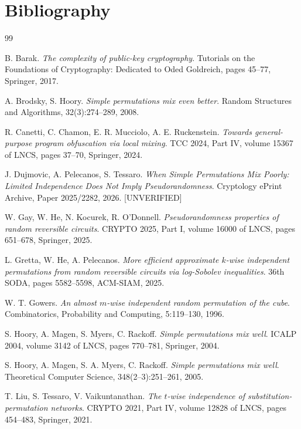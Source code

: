 \documentclass{aicr-conjecture}
\begin{document}
\section{Bibliography}

\begin{aicrbibliography}{99}

B. Barak.
\emph{The complexity of public-key cryptography}.
Tutorials on the Foundations of Cryptography: Dedicated to Oded
Goldreich, pages 45--77, Springer, 2017.

A. Brodsky, S. Hoory.
\emph{Simple permutations mix even better}.
Random Structures and Algorithms, 32(3):274--289, 2008.

R. Canetti, C. Chamon, E. R. Mucciolo, A. E. Ruckenstein.
\emph{Towards general-purpose program obfuscation via local mixing}.
TCC 2024, Part IV, volume 15367 of LNCS, pages 37--70, Springer, 2024.

J. Dujmovic, A. Pelecanos, S. Tessaro.
\emph{When Simple Permutations Mix Poorly: Limited Independence Does Not
Imply Pseudorandomness}.
Cryptology ePrint Archive, Paper 2025/2282, 2026. [UNVERIFIED]

W. Gay, W. He, N. Kocurek, R. O'Donnell.
\emph{Pseudorandomness properties of random reversible circuits}.
CRYPTO 2025, Part I, volume 16000 of LNCS, pages 651--678, Springer,
2025.

L. Gretta, W. He, A. Pelecanos.
\emph{More efficient approximate $k$-wise independent permutations from
random reversible circuits via log-Sobolev inequalities}.
36th SODA, pages 5582--5598, ACM-SIAM, 2025.

W. T. Gowers.
\emph{An almost $m$-wise independent random permutation of the cube}.
Combinatorics, Probability and Computing, 5:119--130, 1996.

S. Hoory, A. Magen, S. Myers, C. Rackoff.
\emph{Simple permutations mix well}.
ICALP 2004, volume 3142 of LNCS, pages 770--781, Springer, 2004.

S. Hoory, A. Magen, S. A. Myers, C. Rackoff.
\emph{Simple permutations mix well}.
Theoretical Computer Science, 348(2--3):251--261, 2005.

T. Liu, S. Tessaro, V. Vaikuntanathan.
\emph{The $t$-wise independence of substitution-permutation networks}.
CRYPTO 2021, Part IV, volume 12828 of LNCS, pages 454--483, Springer,
2021.

\end{aicrbibliography}
\end{document}

